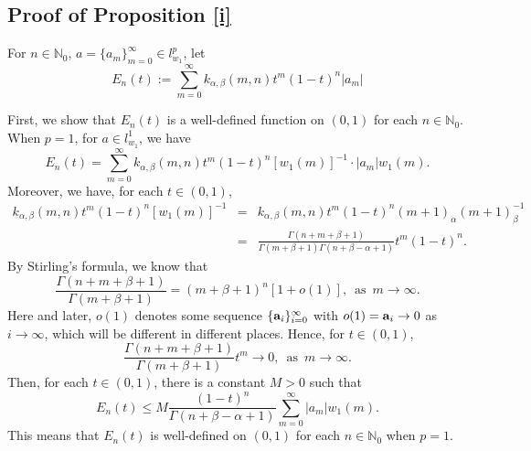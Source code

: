 \documentclass[10pt]{amsart}
\theoremstyle{definition}
\theoremstyle{question}
\numberwithin{equation}{section}
\begin{document}
\subsection{Proof of Proposition \ref{i}}
 

 
For $n\in \mathbb{N}_0$, $a=\{a_m\}_{m=0}^{\infty}\in l_{w_1}^{p}$, let 
$$E_n(t):=\sum_{m=0}^{\infty}k_{\alpha, \beta}(m,n)t^m (1-t)^n |a_m| $$

First, we show that $E_n(t)$ is a well-defined function on $(0,1)$ for each $n\in \mathbb{N}_0$.
When $p=1$, for $a\in l_{w_1}^{1}$, we have
\begin{equation}
E_n(t)=\sum_{m=0}^{\infty}k_{\alpha, \beta}(m,n)t^m (1-t)^n[w_{1}(m)]^{-1}\cdot|a_m|w_{1}(m). \nonumber
\end{equation}
Moreover, we have, for each $t\in (0,1)$,
\begin{eqnarray}
 k_{\alpha, \beta}(m,n)t^m (1-t)^n[w_{1}(m)]^{-1}&=&k_{\alpha, \beta}(m,n)t^m (1-t)^n (m+1)_{\alpha}(m+1)_{\beta}^{-1} \nonumber \\
 &=& \frac{\Gamma(n+m+\beta+1)}{\Gamma(m+\beta+1)\Gamma(n+\beta-\alpha+1)}t^m (1-t)^n. \nonumber
\end{eqnarray}
By Stirling's formula, we know that
\begin{equation}
\frac{\Gamma(n+m+\beta+1)}{\Gamma(m+\beta+1)}=(m+\beta+1)^{n}[1+o(1)],\,\,\, {\text{as}}\,\,\, m\rightarrow \infty. \nonumber 
\end{equation} 
Here and later, $o(1)$ denotes some sequence $\{{\bf a}_i\}_{i=0}^{\infty}$ with $o(1)={\bf a}_i\rightarrow 0$ as $i \rightarrow \infty$, which will be different in different places. 
Hence, for $t\in (0,1)$,
 $$\frac{\Gamma(n+m+\beta+1)}{\Gamma(m+\beta+1)}t^m \rightarrow 0,\,\,\,{\text{as}}\,\,\, m\rightarrow \infty.$$
Then, for each $t\in (0,1)$, there is a constant $M>0$ such that
\begin{equation}
E_n(t)\leq M\frac{(1-t)^n}{\Gamma(n+\beta-\alpha+1)}\sum_{m=0}^{\infty}|a_m|w_{1}(m). \nonumber
\end{equation}
This means that $E_{n}(t)$ is well-defined on $(0,1)$ for each $n\in \mathbb{N}_0$ when $p=1$.
\end{document}
